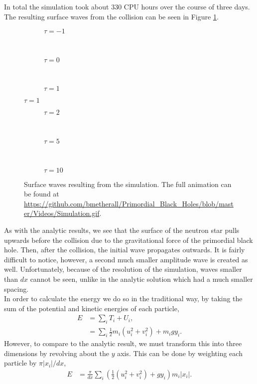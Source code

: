 In total the simulation took about 330 CPU hours over the course of three days. The resulting surface waves from the collision can be seen in Figure \ref{fig:simresults}.
\begin{figure}[p]
\centering
\begin{subfigure}{\textwidth}

\caption{$\tau = -1$}
\end{subfigure} \\
\begin{subfigure}{\textwidth}

\caption{$\tau = 0$}
\end{subfigure} \\
\begin{subfigure}{\textwidth}

\caption{$\tau = 1$}
\end{subfigure}
\end{figure}
\begin{figure}[p] \ContinuedFloat
\centering
\begin{subfigure}{\textwidth}

\caption{$\tau = 2$}
\end{subfigure} \\
\begin{subfigure}{\textwidth}

\caption{$\tau = 5$}
\end{subfigure} \\
\begin{subfigure}{\textwidth}

\caption{$\tau = 10$}
\end{subfigure}
\caption[Surface waves resulting from the simulation]{Surface waves resulting from the simulation.  The full animation can be found at \url{https://github.com/bmetherall/Primordial_Black_Holes/blob/master/Videos/Simulation.gif}.}
\label{fig:simresults}
\end{figure}
As with the analytic results, we see that the surface of the neutron star pulls upwards before the collision due to the gravitational force of the primordial black hole. Then, after the collision, the initial wave propagates outwards. It is fairly difficult to notice, however, a second much smaller amplitude wave is created as well. Unfortunately, because of the resolution of the simulation, waves smaller than $dx$ cannot be seen, unlike in the analytic solution which had a much smaller spacing. \\

In order to calculate the energy we do so in the traditional way, by taking the sum of the potential and kinetic energies of each particle,
\begin{align*}
E &= \sum_i T_i + U_i, \\
&= \sum_i \frac{1}{2} m_i \left( u_i^2 + v_i^2 \right) + m_i g y_i.
\end{align*}
However, to compare to the analytic result, we must transform this into three dimensions by revolving about the $y$ axis. This can be done by weighting each particle by $\pi |x_i| / dx$,
\begin{align*}
E &= \frac{\pi}{dx} \sum_i \left( \frac{1}{2} \left( u_i^2 + v_i^2 \right) + g y_i \right) m_i |x_i|.
\end{align*}

